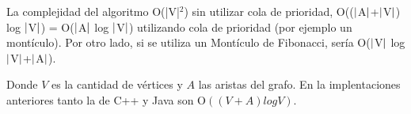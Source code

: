 La complejidad del algoritmo O(|V|$^{2}$) sin utilizar cola de prioridad, O(($\arrowvert$A$\arrowvert$+$\arrowvert$V$\arrowvert$) log $\arrowvert$V$\arrowvert$) = O($\arrowvert$A$\arrowvert$ log $\arrowvert$V$\arrowvert$) utilizando cola de prioridad (por ejemplo un montículo). Por otro lado, si se utiliza un Montículo de Fibonacci, sería O($\arrowvert$V$\arrowvert$ log $\arrowvert$V$\arrowvert$+$\arrowvert$A$\arrowvert$).

Donde $V$ es la cantidad de vértices y $A$ las aristas del grafo. En la implentaciones anteriores tanto la de C++ y Java son  O$((V+A)log V)$.